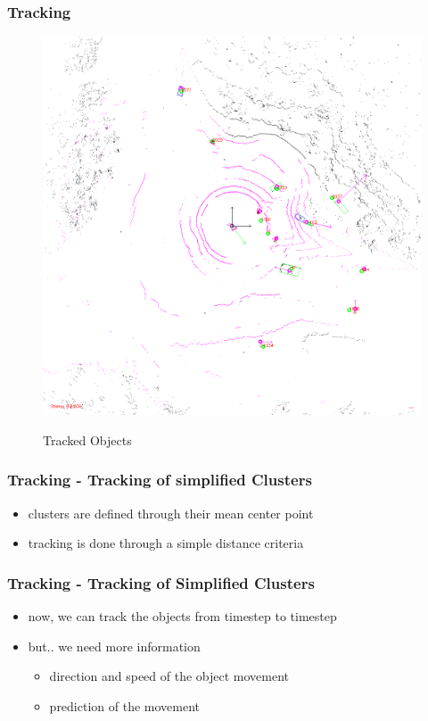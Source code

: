 \documentclass[nosymbols]{beamer}	%
\begin{document}
\begin{frame}
\frametitle{Tracking}
\begin{figure}[!ht]
\caption{Tracked Objects}
\includegraphics[width=\textwidth,height=0.7\textheight,keepaspectratio]{bilder/clust/img100084.png}
\label{segments}
\end{figure}
\end{frame}

\begin{frame}
\frametitle{Tracking - Tracking of simplified Clusters}
  \begin{itemize}
    \item clusters are defined through their mean center point
    \item tracking is done through a simple distance criteria    
  \end{itemize}
\end{frame}

\begin{frame}
\frametitle{Tracking - Tracking of Simplified Clusters}
  \begin{itemize}
    \item now, we can track the objects from timestep to timestep
    \item but.. we need more information
    \begin{itemize}
    \item direction and speed of the object movement
    \item prediction of the movement
    \end{itemize}
  \end{itemize}
\end{frame}
\end{document}
